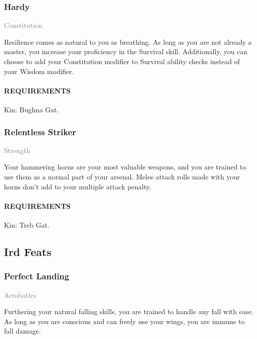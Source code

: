         \subsubsection{Hardy} \label{feat::hardy}
        \small{\textcolor{gray}{Constitution}}

        \normalsize
        Resilience comes as natural to you as breathing.
        As long as you are not already a master, you increase your proficiency in the Survival skill.
        Additionally, you can choose to add your Constitution modifier to Survival ability checks   instead of your Wisdom modifier.
        \paragraph{REQUIREMENTS} Kin: Bughna Gat.

        \subsubsection{Relentless Striker} \label{feat::relentlessstriker}
        \small{\textcolor{gray}{Strength}}

        \normalsize
        Your hammering horns are your most valuable weapons, and you are trained to use them as a normal    part of your arsenal.
        Melee attack rolls made with your horns don't add to your multiple attack penalty.
        \paragraph{REQUIREMENTS} Kin: Treb Gat.

\subsection*{Ird Feats}
    \subsubsection{Perfect Landing} \label{feat::perfectlanding}
    \small{\textcolor{gray}{Acrobatics}}

    \normalsize
    Furthering your natural falling skills, you are trained to handle any fall with ease.
    As long as you are conscious and can freely use your wings, you are immune to fall damage.
